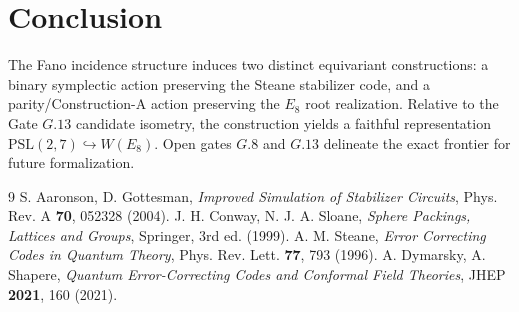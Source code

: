 \documentclass[11pt,a4paper]{article}
\theoremstyle{definition}
\begin{document}
	\section{Conclusion}
	
	The Fano incidence structure induces two distinct equivariant constructions: a binary symplectic action preserving the Steane stabilizer code, and a parity/Construction-A action preserving the $E_8$ root realization. Relative to the Gate $G.13$ candidate isometry, the construction yields a faithful representation $\mathrm{PSL}(2,7) \hookrightarrow W(E_8)$. Open gates $G.8$ and $G.13$ delineate the exact frontier for future formalization.
	
	\begin{thebibliography}{9}
		 S. Aaronson, D. Gottesman, \textit{Improved Simulation of Stabilizer Circuits}, Phys. Rev. A \textbf{70}, 052328 (2004).
		 J. H. Conway, N. J. A. Sloane, \textit{Sphere Packings, Lattices and Groups}, Springer, 3rd ed. (1999).
		 A. M. Steane, \textit{Error Correcting Codes in Quantum Theory}, Phys. Rev. Lett. \textbf{77}, 793 (1996).
		 A. Dymarsky, A. Shapere, \textit{Quantum Error-Correcting Codes and Conformal Field Theories}, JHEP \textbf{2021}, 160 (2021).
	\end{thebibliography}
	
\end{document}
